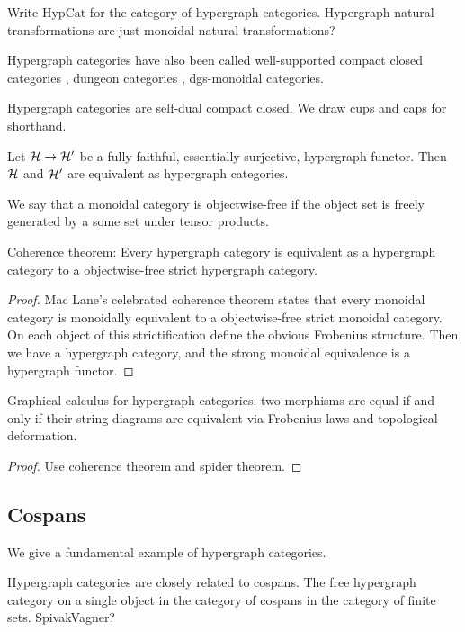 Write $\mathrm{HypCat}$ for the category of hypergraph categories. Hypergraph
natural transformations are just monoidal natural transformations?

Hypergraph categories have also been called well-supported compact closed
categories \cite{Ca}, dungeon categories \cite{Mo}, dgs-monoidal categories. 

Hypergraph categories are self-dual compact closed. We draw cups and caps for
shorthand.

\begin{proposition}
  Let $\mathcal H \to \mathcal H'$ be a fully faithful, essentially surjective, hypergraph
  functor. Then $\mathcal H$ and $\mathcal H'$ are equivalent as hypergraph categories.
\end{proposition}

We say that a monoidal category is objectwise-free if the object set is freely
generated by a some set under tensor products.

\begin{proposition}
  Coherence theorem: Every hypergraph category is equivalent as a hypergraph category to a
  objectwise-free strict hypergraph category.
\end{proposition}
\begin{proof}
  Mac Lane's celebrated coherence theorem states that every monoidal category is
  monoidally equivalent to a objectwise-free strict monoidal category. On each
  object of this strictification define the obvious Frobenius structure. Then
  we have a hypergraph category, and the strong monoidal equivalence is a
  hypergraph functor.
\end{proof}


\begin{proposition}
  Graphical calculus for hypergraph categories: two morphisms are equal if and
  only if their string diagrams are equivalent via Frobenius laws and
  topological deformation.
\end{proposition}
\begin{proof}
  Use coherence theorem and spider theorem.
\end{proof}

\subsection{Cospans}
We give a fundamental example of hypergraph categories.

  Hypergraph categories are closely related to cospans. The free hypergraph
  category on a single object in the category of cospans in the category of
  finite sets. SpivakVagner?
  
